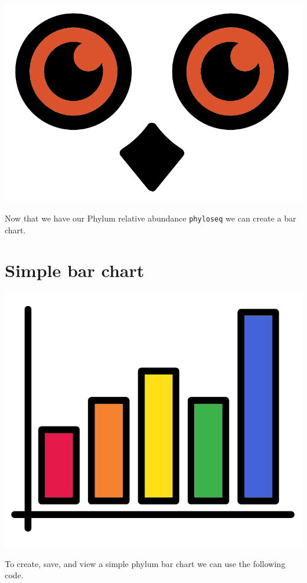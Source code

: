 \documentclass[
]{book}
\begin{document}
\includegraphics{figures/owl_eyes.png}

Now that we have our Phylum relative abundance \texttt{phyloseq} we can create a bar chart.

\hypertarget{simple-bar-chart}{%
\section{Simple bar chart}\label{simple-bar-chart}}

\includegraphics{figures/bar_chart.png}

To create, save, and view a simple phylum bar chart we can use the following code.
\end{document}
